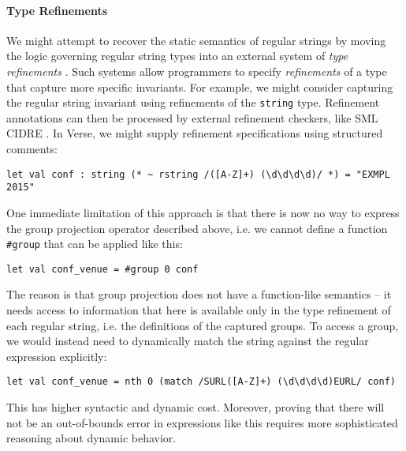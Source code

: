 \paragraph{Type Refinements}
We might attempt to recover the static semantics of regular strings by moving the logic governing regular string types into an external system of \emph{type refinements} \cite{Freeman91}. %
Such  systems allow programmers to specify \emph{refinements} of a type that capture more specific invariants. For example, we might consider capturing the regular string invariant using refinements of the \lstinline{string} type. Refinement annotations can then be processed by external refinement checkers, like SML CIDRE \cite{davies1997refinement}. In Verse, we might supply refinement specifications using structured comments:
\begin{lstlisting}[numbers=none]
let val conf : string (* ~ rstring /([A-Z]+) (\d\d\d\d)/ *) = "EXMPL 2015"
\end{lstlisting}
One immediate limitation of this approach is that there is now no way to express the group projection operator described above, i.e. we cannot define a function \lstinline{#group} that can be applied like this:
\begin{lstlisting}[numbers=none]
let val conf_venue = #group 0 conf
\end{lstlisting}
The reason is that group projection does not have a function-like semantics -- it needs access to information that here is  available only in the type refinement of each regular string, i.e. the definitions of the captured groups. To access a group, we would instead need to dynamically match the string against the regular expression explicitly:

\begin{lstlisting}[numbers=none]
let val conf_venue = nth 0 (match /SURL([A-Z]+) (\d\d\d\d)EURL/ conf)
\end{lstlisting}
This has higher syntactic and dynamic cost. Moreover, proving that there will not be an out-of-bounds error in expressions like this requires more sophisticated reasoning about dynamic behavior.


